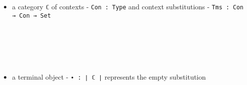 \begin{itemize}
  \item{a category \texttt{ℂ} of contexts - \texttt{Con : Type} and context substitutions - \texttt{Tms : Con → Con → Set}}
  \begin{code}%
\>[0][@{}l@{\AgdaIndent{1}}]%
\>[4]%
\>[9]\AgdaSymbol{:}\AgdaSpace{}%
\AgdaSpace{}%
\AgdaSpace{}%
\<%
\\
%
\>[4]%
\>[9]\AgdaSymbol{:}\AgdaSpace{}%
\AgdaSpace{}%
\AgdaSpace{}%
\AgdaSpace{}%
\AgdaSpace{}%
\AgdaSpace{}%
\AgdaSpace{}%
\AgdaSpace{}%
\AgdaSpace{}%
\AgdaSpace{}%
\AgdaSpace{}%
\<%
\\
%
\>[4]%
\>[9]\AgdaSymbol{:}\AgdaSpace{}%
\AgdaSpace{}%
\AgdaSpace{}%
\AgdaSpace{}%
\AgdaSpace{}%
\<%
\\
%
\>[4]%
\>[9]\AgdaSymbol{:}\AgdaSpace{}%
\AgdaSpace{}%
\AgdaSpace{}%
\AgdaSpace{}%
\AgdaSpace{}%
\<%
\\
%
\>[4]%
\>[9]\AgdaSymbol{:}\AgdaSpace{}%
\AgdaSymbol{(}\AgdaSpace{}%
\AgdaSpace{}%
\AgdaSymbol{)}\AgdaSpace{}%
\AgdaSpace{}%
\AgdaSpace{}%
\AgdaSpace{}%
\AgdaSpace{}%
\AgdaSpace{}%
\AgdaSymbol{(}\AgdaSpace{}%
\AgdaSpace{}%
\AgdaSymbol{)}\<%
\end{code}
  \item{a terminal object - \texttt{∙ : ∣ ℂ ∣} represents the empty substitution}
  \begin{code}%
%
\>[4]%
\>[9]\AgdaSymbol{:}\AgdaSpace{}%
\<%
\\

\end{code}
\end{itemize}
